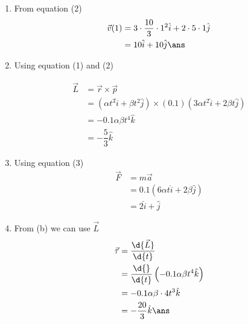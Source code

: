 \documentclass{article}
\begin{document}
\begin{enumerate}[label=(\alph*)]
\item From equation (2)
\begin{align*}
\vec{v}(1) &= 3\cdot\dfrac{10}{3}\cdot 1^2\hat{i} + 2\cdot 5 \cdot 1\hat{j}\\
&= 10\hat{i} + 10\hat{j} \ans
\end{align*}

\item Using equation (1) and (2)

\begin{align*}
\vec{L} &= \vec{r} \times \vec{p}\\
		&= \left(\alpha t^3 \hat{i} + \beta t^2\hat{j} \right) \times \left(0.1\right)\left(3\alpha t^2\hat{i} + 2\beta t\hat{j}\right)\\
		&= -0.1\alpha\beta t^4\hat{k}\\
		&= -\dfrac{5}{3}\hat{k}
\end{align*}

\item Using equation (3)
\begin{align*}
\vec{F} &= m\vec{a}\\
		&= 0.1 \left( 6\alpha t\hat{i} + 2\beta\hat{j} \right)\\
		&= 2\hat{i} + \hat{j}
\end{align*}

\item From (b) we can use $\vec{L}$
\begin{align*}
\vec{\tau} &= \dfrac{\d{\vec{L}}}{\d{t}} \\
		&= \dfrac{\d{}}{\d{t}}\left(-0.1\alpha\beta t^4 \hat{k} \right)\\
		&= -0.1\alpha\beta \cdot 4t^3\hat{k}\\
		&= -\dfrac{20}{3}\hat{k} \ans
\end{align*}
\end{enumerate}



\vspace*{\fill}
\begin{center}
	\fbox{\qrcode[height=2cm]{\gdrive}}
\end{center}
\vspace*{\fill}
\end{document}
